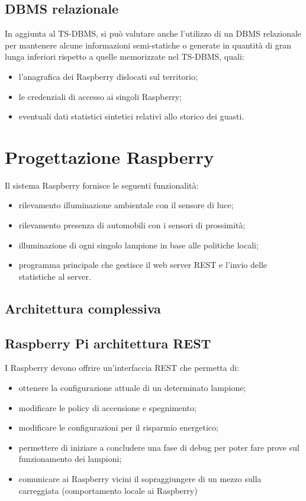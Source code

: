 \subsection{DBMS relazionale}
In aggiunta al TS-DBMS, si può valutare anche l'utilizzo di un DBMS relazionale per mantenere alcune informazioni semi-statiche o generate in quantità di gran lunga inferiori rispetto a quelle memorizzate nel TS-DBMS, quali:
\begin{itemize}
 \item l'anagrafica dei Raspberry dislocati sul territorio;
 \item le credenziali di accesso ai singoli Raspberry;
 \item eventuali dati statistici sintetici relativi allo storico dei guasti.
\end{itemize}


\section{Progettazione Raspberry}
Il sistema Raspberry fornisce le seguenti funzionalità:
\begin{itemize}
 \item rilevamento illuminazione ambientale con il sensore di luce;
 \item rilevamento presenza di automobili con i sensori di prossimità;
 \item illuminazione di ogni singolo lampione in base alle politiche locali;
 \item programma principale che gestisce il web server REST e l'invio delle statistiche al server.
\end{itemize}

\subsection{Architettura complessiva}

\subsection{Raspberry Pi architettura REST}
I Raspberry devono offrire un'interfaccia REST che permetta di:
\begin{itemize}
	\item ottenere la configurazione attuale di un determinato lampione;
	\item modificare le policy di accensione e spegnimento;
	\item modificare le configurazioni per il risparmio energetico;
	\item permettere di iniziare a concludere una fase di debug per poter fare prove sul funzionamento dei lampioni;
	\item comunicare ai Raspberry vicini il sopraggiungere di un mezzo sulla carreggiata (comportamento locale ai Raspberry)
\end{itemize}


